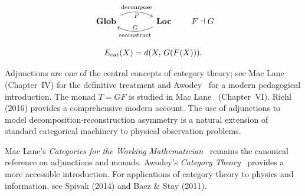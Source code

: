 
\[
\begin{tikzcd}[column sep=4em]
  \mathbf{Glob}
  \arrow[r,bend left=25,"F"',"{\rm decompose}"]
  &
  \mathbf{Loc}
  \arrow[l,bend left=25,"G"',"{\rm reconstruct}"]
\end{tikzcd}
\qquad
F \dashv G
\]

\[
E_{\rm cat}(X) = d(X,\,G(F(X))).
\]

\begin{CitationAnchor}
  Adjunctions are one of the central concepts of category theory;
  see Mac Lane~\cite{maclane1998} (Chapter~IV) for the definitive
  treatment and Awodey~\cite{awodey2010} for a modern pedagogical
  introduction.
  The monad $T = GF$ is studied in Mac Lane~\cite{maclane1998}
  (Chapter~VI).
  Riehl (2016) provides a comprehensive modern account.
  The use of adjunctions to model decomposition-reconstruction
  asymmetry is a natural extension of standard categorical
  machinery to physical observation problems.
\end{CitationAnchor}

\begin{FurtherReading}
  Mac Lane's \textit{Categories for the Working Mathematician}~\cite{maclane1998}
  remains the canonical reference on adjunctions and monads.
  Awodey's \textit{Category Theory}~\cite{awodey2010} provides
  a more accessible introduction.
  For applications of category theory to physics and information,
  see Spivak (2014) and Baez \& Stay (2011).
\end{FurtherReading}
